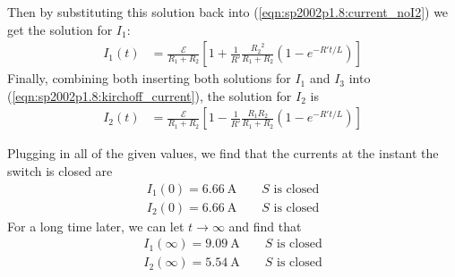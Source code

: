 Then by substituting this solution back into (\ref{eqn:sp2002p1.8:current_noI2})
we get the solution for $I_1$:
\begin{align}
    I_1(t) &= \frac{\mathcal E}{R_1+R_2} \left[ 1 + \frac{1}{R'}
	\frac{{R_2}^2}{R_1+R_2} (1 - e^{-R't/L}) \right]
	\label{eqn:sp2002p1.8:I1_charging}
\end{align}
Finally, combining both inserting both solutions for $I_1$ and $I_3$ into
(\ref{eqn:sp2002p1.8:kirchoff_current}), the solution for $I_2$ is
\begin{align}
    I_2(t) &= \frac{\mathcal E}{R_1+R_2} \left[ 1 - \frac{1}{R'}
	\frac{R_1R_2}{R_1+R_2} (1 - e^{-R't/L}) \right]
	\label{eqn:sp2002p1.8:I2_charging}
\end{align}

Plugging in all of the given values, we find that the currents at the instant
the switch is closed are
\begin{align}
    \boxed{I_1(0) = \SI{6.66}{\A}\quad\quad\text{$S$ is closed}} \\
    \boxed{I_2(0) = \SI{6.66}{\A}\quad\quad\text{$S$ is closed}}
\end{align}
For a long time later, we can let $t \rightarrow \infty $ and find that
\begin{align}
    \boxed{I_1(\infty ) = \SI{9.09}{\A}\quad\quad\text{$S$ is closed}} \\
    \boxed{I_2(\infty ) = \SI{5.54}{\A}\quad\quad\text{$S$ is closed}}
\end{align}


